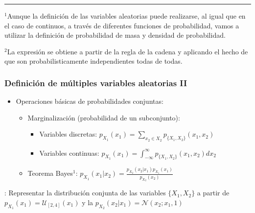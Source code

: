 \documentclass{beamer}
\numberwithin{section}{part}
\begin{document}
\begin{frame}
  \vspace{-0.3cm}

  \rule{11cm}{0.04ex}
  \scriptsize
  $^1$Aunque la definición de las variables aleatorias puede realizarse, al igual que en el caso de continuos, a través de diferentes funciones de probabilidad, vamos a utilizar la definición de probabilidad de masa y densidad de probabilidad.

  \vspace{0.1cm}

  $^2$La expresión se obtiene a partir de la regla de la cadena y aplicando el hecho de que son probabilisticamente independientes todas de todas. 
\end{frame}


\begin{frame}
  \frametitle{Definición de múltiples variables aleatorias II}
  \footnotesize

  \begin{itemize}
    \item Operaciones básicas de probabilidades conjuntas:
    \begin{itemize}
      \footnotesize
      \item Marginalización (probabilidad de un subconjunto):
      \begin{itemize}
        \item Variables discretas: $p_{X_1}(x_1)=\sum_{x_2\in X_2} p_{\{X_1,X_2\}}(x_1,x_2)$
        \item Variables continuas: $p_{X_1}(x_1)=\int_{-\infty}^{\infty} p_{\{X_1,X_2\}}(x_1,x_2)dx_2$
      \end{itemize}
      \item Teorema Bayes$^1$: $p_{X_1}(x_1|x_2)=\frac{p_{X_2}(x_2|x_1)p_{X_1}(x_1)}{p_{X_2}(x_2)}$
    \end{itemize}
  \end{itemize}

  \color{olivegreen}{Ejemplo continuo}: Representar la distribución conjunta de las variables $\{X_1,X_2\}$ a partir de 
  $p_{X_1}(x_1)=\mathcal{U}_{[2,4]}(x_1)$ y la $p_{X_2}(x_2|x_1)=\mathcal{N}(x_2;x_1,1)$

  \color{gray}

  \vspace{-0.3cm}


\end{frame}
\end{document}
